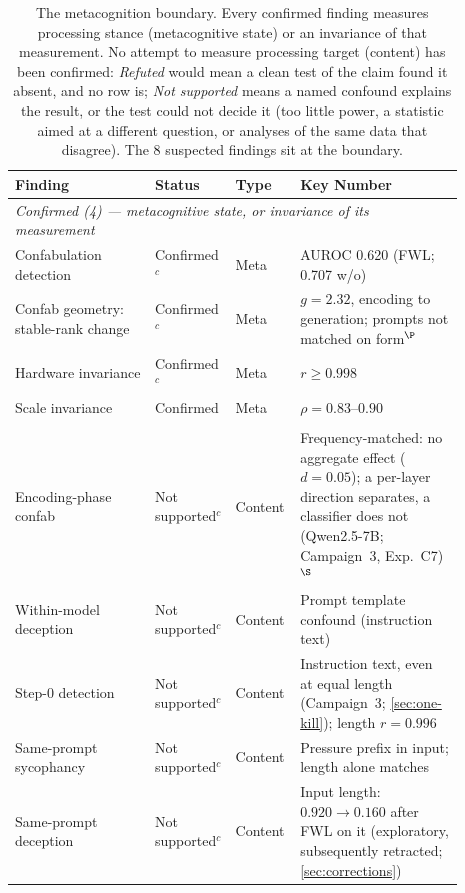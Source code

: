 \documentclass[11pt,a4paper]{article}
\begin{document}
\begin{table}[H]
\centering
\small
\caption{The metacognition boundary. Every confirmed finding measures
processing stance (metacognitive state) or an invariance of that
measurement. No attempt to measure
processing target (content) has been confirmed: \emph{Refuted} would
mean a clean test of the claim found it absent, and no row is;
\emph{Not supported} means a named confound explains the result, or
the test could not decide it (too little power, a statistic aimed at a
different question, or analyses of the same data that disagree).
The 8 suspected findings sit at the boundary.}
\label{tab:bodycount}
\begin{tabular}{p{0.30\linewidth}p{0.15\linewidth}p{0.09\linewidth}p{0.35\linewidth}}
\toprule
\textbf{Finding} & \textbf{Status} & \textbf{Type} & \textbf{Key Number} \\
\midrule
\multicolumn{4}{l}{\textit{Confirmed (4) --- metacognitive state, or invariance of its measurement}} \\
\addlinespace
Confabulation detection & Confirmed$^{c}$ & Meta & AUROC 0.620 (FWL; 0.707 w/o) \\
Confab geometry: stable-rank change & Confirmed$^{c}$ & Meta & $g{=}2.32$, encoding to generation; prompts not matched on form$^{\P}$ \\
Hardware invariance & Confirmed$^{c}$ & Meta & $r{\geq}0.998$ \\
Scale invariance & Confirmed & Meta & $\rho{=}0.83$--$0.90$ \\
\addlinespace
\midrule
\multicolumn{4}{l}{\textit{Not confirmed (8) --- all content}} \\
\addlinespace
Encoding-phase confab & Not supported$^{c}$ & Content &Frequency-matched: no aggregate effect ($d{=}0.05$); a per-layer direction separates, a classifier does not (Qwen2.5-7B; Campaign~3, Exp.~C7)$^{\S}$ \\
Within-model deception & Not supported$^{c}$ & Content &Prompt template confound (instruction text) \\
Step-0 detection & Not supported$^{c}$ & Content &Instruction text, even at equal length (Campaign~3; \cref{sec:one-kill}); length $r{=}0.996$ \\
Same-prompt sycophancy & Not supported$^{c}$ & Content &Pressure prefix in input; length alone matches \\
Same-prompt deception & Not supported$^{c}$ & Content &Input length: $0.920 \to 0.160$ after FWL on it (exploratory, subsequently retracted; \cref{sec:corrections}) \\

\end{tabular}
\end{table}
\end{document}
